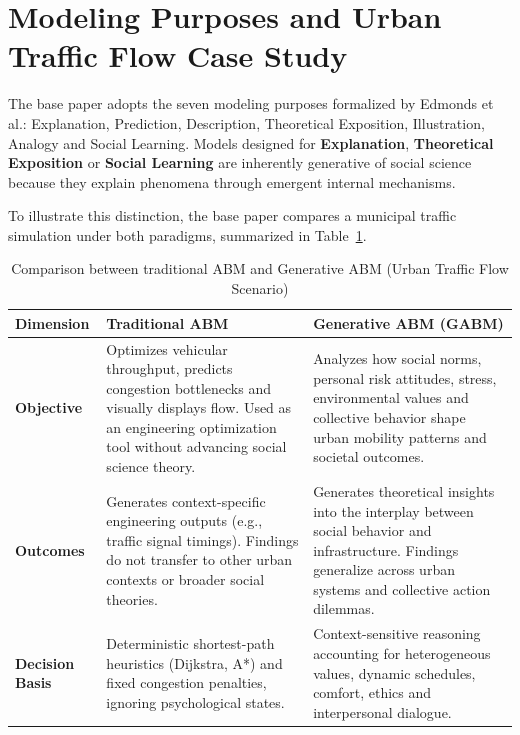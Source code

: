 \documentclass[12pt,a4paper]{report}
\begin{document}
\section{Modeling Purposes and Urban Traffic Flow Case Study}
\label{sec:traffic_case}

The base paper adopts the seven modeling purposes formalized by Edmonds et al.: Explanation, Prediction, Description, Theoretical Exposition, Illustration, Analogy and Social Learning. Models designed for \textbf{Explanation}, \textbf{Theoretical Exposition} or \textbf{Social Learning} are inherently generative of social science because they explain phenomena through emergent internal mechanisms.

To illustrate this distinction, the base paper compares a municipal traffic simulation under both paradigms, summarized in Table~\ref{tab:table1_traffic}.

\begin{table}[H]
\centering
\caption{Comparison between traditional ABM and Generative ABM (Urban Traffic Flow Scenario)}
\label{tab:table1_traffic}
\vspace{0.2cm}
\setlength{\tabcolsep}{4pt}
\renewcommand{\arraystretch}{1.15}
\small
\begin{tabular}{|p{2.3cm}|p{6.0cm}|p{6.3cm}|}
\hline
\textbf{Dimension} & \textbf{Traditional ABM} & \textbf{Generative ABM (GABM)} \\
\hline
\textbf{Objective} & Optimizes vehicular throughput, predicts congestion bottlenecks and visually displays flow. Used as an engineering optimization tool without advancing social science theory. & Analyzes how social norms, personal risk attitudes, stress, environmental values and collective behavior shape urban mobility patterns and societal outcomes. \\
\hline
\textbf{Outcomes} & Generates context-specific engineering outputs (e.g., traffic signal timings). Findings do not transfer to other urban contexts or broader social theories. & Generates theoretical insights into the interplay between social behavior and infrastructure. Findings generalize across urban systems and collective action dilemmas. \\
\hline
\textbf{Decision Basis} & Deterministic shortest-path heuristics (Dijkstra, A*) and fixed congestion penalties, ignoring psychological states. & Context-sensitive reasoning accounting for heterogeneous values, dynamic schedules, comfort, ethics and interpersonal dialogue. \\
\hline
\end{tabular}
\end{table}
\end{document}
